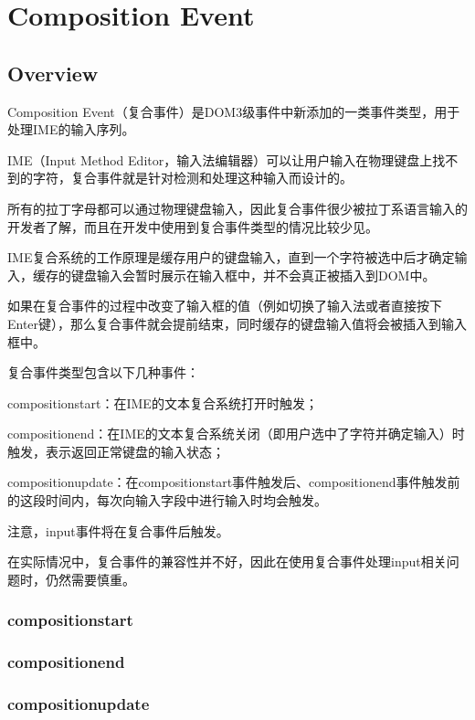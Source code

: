 \part{Composition Event}

\chapter{Overview}


Composition Event（复合事件）是DOM3级事件中新添加的一类事件类型，用于处理IME的输入序列。

IME（Input Method Editor，输入法编辑器）可以让用户输入在物理键盘上找不到的字符，复合事件就是针对检测和处理这种输入而设计的。

所有的拉丁字母都可以通过物理键盘输入，因此复合事件很少被拉丁系语言输入的开发者了解，而且在开发中使用到复合事件类型的情况比较少见。

IME复合系统的工作原理是缓存用户的键盘输入，直到一个字符被选中后才确定输入，缓存的键盘输入会暂时展示在输入框中，并不会真正被插入到DOM中。

如果在复合事件的过程中改变了输入框的值（例如切换了输入法或者直接按下Enter键），那么复合事件就会提前结束，同时缓存的键盘输入值将会被插入到输入框中。

复合事件类型包含以下几种事件：

\begin{compactitem}
\item compositionstart：在IME的文本复合系统打开时触发；
\item compositionend：在IME的文本复合系统关闭（即用户选中了字符并确定输入）时触发，表示返回正常键盘的输入状态；
\item compositionupdate：在compositionstart事件触发后、compositionend事件触发前的这段时间内，每次向输入字段中进行输入时均会触发。
\end{compactitem}

注意，input事件将在复合事件后触发。

在实际情况中，复合事件的兼容性并不好，因此在使用复合事件处理input相关问题时，仍然需要慎重。

\section{compositionstart}


\section{compositionend}


\section{compositionupdate}






